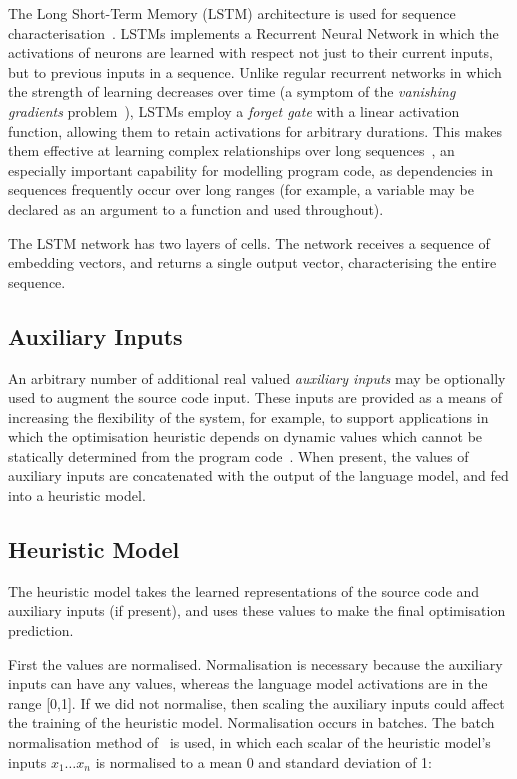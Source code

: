 The Long Short-Term Memory (LSTM) architecture is used for sequence characterisation~\cite{Hochreiter1997}. LSTMs implements a Recurrent Neural Network in which the activations of neurons are learned with respect not just to their current inputs, but to previous inputs in a sequence. Unlike regular recurrent networks in which the strength of learning decreases over time (a symptom of the \emph{vanishing gradients} problem~\cite{Pacanu2013}), LSTMs employ a \emph{forget gate} with a linear activation function, allowing them to retain activations for arbitrary durations. This makes them effective at learning complex relationships over long sequences~\cite{Lipton2015}, an especially important capability for modelling program code, as dependencies in sequences frequently occur over long ranges (for example, a variable may be declared as an argument to a function and used throughout).

The LSTM network has two layers of cells. The network receives a sequence of embedding vectors, and returns a single output vector, characterising the entire sequence.


\subsection{Auxiliary Inputs}

An arbitrary number of additional real valued \emph{auxiliary inputs} may be optionally used to augment the source code input. These inputs are provided as a means of increasing the flexibility of the system, for example, to support applications in which the optimisation heuristic depends on dynamic values which cannot be statically determined from the program code~\cite{Ding2015,Stephenson2005}. When present, the values of auxiliary inputs are concatenated with the output of the language model, and fed into a heuristic model.


\subsection{Heuristic Model}

The heuristic model takes the learned representations of the source code and auxiliary inputs (if present), and uses these values to make the final optimisation prediction.

First the values are normalised. Normalisation is necessary because the auxiliary inputs can have any values, whereas the language model activations are in the range [0,1]. If we did not normalise, then scaling the auxiliary inputs could affect the training of the heuristic model. Normalisation occurs in batches. The batch normalisation method of~\cite{Ioffe2015a} is used, in which each scalar of the heuristic model's inputs $x_1 \ldots x_n$ is normalised to a mean 0 and standard deviation of 1:

